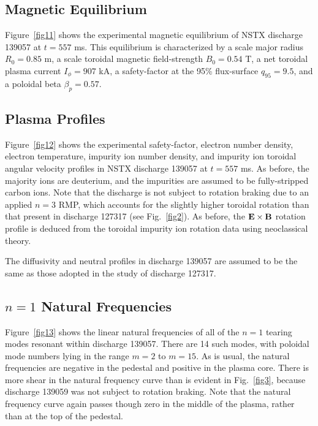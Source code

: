 \documentclass[12pt,prb,aps]{revtex4-1}
\begin{document}
\subsection{Magnetic Equilibrium}
Figure~\ref{fig11} shows the experimental magnetic equilibrium of NSTX discharge 139057 at $t=557$ ms. This equilibrium is characterized by a scale major radius
$R_0=0.85$ m, a scale toroidal magnetic field-strength $B_0=0.54$ T, a net toroidal plasma current $I_\phi = 907$ kA, a safety-factor at the 95\% flux-surface $q_{95} = 9.5$, and a poloidal beta $\beta_p=0.57$. 

\subsection{Plasma Profiles}
Figure~\ref{fig12} shows the experimental safety-factor, electron number density, electron temperature, impurity ion number density, and impurity ion toroidal angular velocity profiles in NSTX discharge 139057 at $t=557$ ms. As before, the majority ions are deuterium, and the impurities are assumed to
be fully-stripped carbon ions. Note that the discharge is not subject to rotation braking due to an applied $n=3$ RMP, which accounts for the slightly higher toroidal rotation than that present in discharge 127317 (see Fig.~\ref{fig2}). As before, the ${\bf E}\times {\bf B}$ rotation profile is deduced from the
toroidal  impurity ion rotation data using neoclassical theory. 

The diffusivity and neutral profiles in discharge 139057 are assumed to be the same as those adopted in the study of
discharge 127317. 

\subsection{$n=1$ Natural Frequencies}
Figure~\ref{fig13} shows the linear natural frequencies of all of the
$n=1$ tearing modes resonant within discharge 139057. There are 14 such modes, with poloidal mode numbers
lying in the range $m=2$ to $m=15$. As is usual, the natural frequencies are negative in the pedestal and
positive in the plasma core. There is more shear in the natural frequency curve than is evident in Fig.~\ref{fig3}, because
discharge 139059 was not subject to rotation braking. Note that the  natural
frequency curve again passes though zero in the middle of the plasma, rather than at the top of the pedestal.
\end{document}
